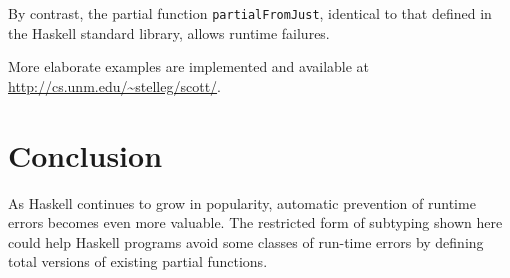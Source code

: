 \documentclass[]{article}
\newenvironment{Shaded}{}{}
\newcommand{\KeywordTok}[1]{\textcolor[rgb]{0.00,0.44,0.13}{\textbf{{#1}}}}
\newcommand{\DataTypeTok}[1]{\textcolor[rgb]{0.56,0.13,0.00}{{#1}}}
\newcommand{\StringTok}[1]{\textcolor[rgb]{0.25,0.44,0.63}{{#1}}}
\newcommand{\OtherTok}[1]{\textcolor[rgb]{0.00,0.44,0.13}{{#1}}}
\newcommand{\FunctionTok}[1]{\textcolor[rgb]{0.02,0.16,0.49}{{#1}}}
\newcommand{\NormalTok}[1]{{#1}}
\begin{document}
\begin{Shaded}
\end{Shaded}

By contrast, the partial function \texttt{partialFromJust}, identical to
that defined in the Haskell standard library, allows runtime failures.

\begin{Shaded}
\end{Shaded}

More elaborate examples are implemented and available at
\url{http://cs.unm.edu/~stelleg/scott/}.

\section{Conclusion}\label{conclusion}

As Haskell continues to grow in popularity, automatic prevention of
runtime errors becomes even more valuable. The restricted form of
subtyping shown here could help Haskell programs avoid some classes of
run-time errors by defining total versions of existing partial
functions.


\end{document}

